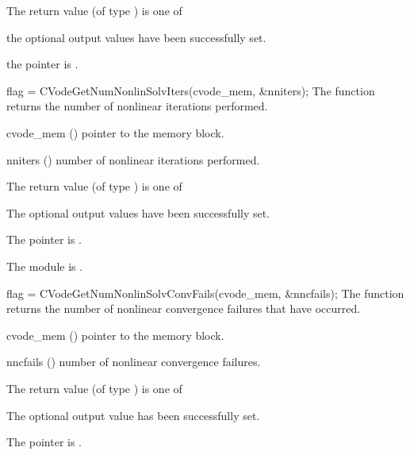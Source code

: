 {
  The return value  (of type ) is one of
  \begin{args}
  \item[\Id{CV\_SUCCESS}]
    the optional output values have been successfully set.
  \item[\Id{CV\_MEM\_NULL}]
    the  pointer is .
  \end{args}
}
{}
{
  flag = CVodeGetNumNonlinSolvIters(cvode\_mem, \&nniters);
}
{
  The function  returns the
  number of nonlinear iterations performed.
}
{
  \begin{args}
  \item[cvode\_mem] ()
    pointer to the {\cvode} memory block.
  \item[nniters] ()
    number of nonlinear iterations performed.
  \end{args}
}
{
  The return value  (of type ) is one of
  \begin{args}
  \item[\Id{CV\_SUCCESS}]
    The optional output values have been successfully set.
  \item[\Id{CV\_MEM\_NULL}]
    The  pointer is .
  \item[\Id{CV\_MEM\_FAIL}]
    The {\sunnonlinsol} module is .
  \end{args}
}
{}
{
  flag = CVodeGetNumNonlinSolvConvFails(cvode\_mem, \&nncfails);
}
{
  The function  returns the
  number of nonlinear convergence failures that have occurred.
}
{
  \begin{args}
  \item[cvode\_mem] ()
    pointer to the {\cvode} memory block.
  \item[nncfails] ()
    number of nonlinear convergence failures.
  \end{args}
}
{
  The return value  (of type ) is one of
  \begin{args}
  \item[\Id{CV\_SUCCESS}]
    The optional output value has been successfully set.
  \item[\Id{CV\_MEM\_NULL}]
    The  pointer is .
  \end{args}
}
{}
